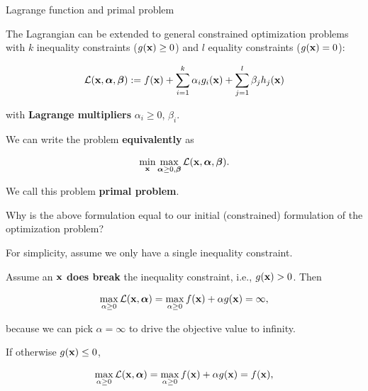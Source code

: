 \begin{vbframe}{Lagrange function and primal problem}

The Lagrangian can be extended to general constrained optimization problems with $k$ inequality constraints ($g(\mathbf{x}) \geq 0$) and $l$ equality constraints ($g(\mathbf{x}) = 0$): 

$$
\mathcal{L}(\mathbf{x}, \bm{\alpha}, \bm{\beta}) := f(\mathbf{x}) + \sum_{i=1}^k \alpha_i g_i(\mathbf{x}) + \sum_{j=1}^l \beta_j h_j(\mathbf{x})
$$

with \textbf{Lagrange multipliers} $\alpha_i\ge 0$, $\beta_i$.

\lz

We can write the problem \textbf{equivalently} as

$$
\min_{\mathbf{x}} \max_{\bm{\alpha}\ge 0, \bm{\beta}}  \mathcal{L}(\mathbf{x}, \bm{\alpha}, \bm{\beta}).
$$

We call this problem \textbf{primal problem}. \\

\vspace*{0.2cm} 

Why is the above formulation equal to our initial (constrained) formulation of the optimization problem? 

\framebreak 

For simplicity, assume we only have a single inequality constraint. 

\vspace*{0.2cm} 

Assume an $\mathbf{x}$ \textbf{does break} the inequality constraint, i.e., $g(\mathbf{x}) > 0$. Then 

\vspace*{-0.5cm} 

\begin{eqnarray*}
	\max_{\alpha \ge 0} \mathcal{L}(\mathbf{x}, \bm{\alpha}) = \max_{\alpha \ge 0} f(\mathbf{x}) +  \alpha g(\mathbf{x}) = \infty,
\end{eqnarray*}

because we can pick $\alpha = \infty$ to drive the objective value to infinity. 

\vspace*{0.2cm} 

If otherwise $g(\mathbf{x}) \le 0$, 

\vspace*{-0.5cm} 

\begin{eqnarray*}
	\max_{\alpha \ge 0} \mathcal{L}(\mathbf{x}, \bm{\alpha}) = \max_{\alpha \ge 0} f(\mathbf{x}) +  \alpha g(\mathbf{x}) = f(\mathbf{x}),
\end{eqnarray*}


\end{vbframe}
